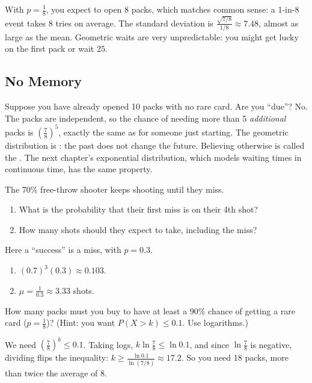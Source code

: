 With $p = \frac{1}{8}$, you expect to open $8$ packs, which matches common sense: a
1-in-8 event takes 8 tries on average. The standard deviation is
$\frac{\sqrt{7/8}}{1/8} \approx 7.48$, almost as large as the mean. Geometric waits are
very unpredictable: you might get lucky on the first pack or wait 25.

\subsection{No Memory}
Suppose you have already opened 10 packs with no rare card. Are you ``due''? No. The
packs are independent, so the chance of needing more than 5 \emph{additional} packs is
$\left(\frac{7}{8}\right)^5$, exactly the same as for someone just starting. The geometric
distribution is : the past does not change the future. Believing
otherwise is called the . The next chapter's exponential
distribution, which models waiting times in continuous time, has the same property.

\begin{Exercise}[title={The First Miss}, label=bg_miss]
The 70\% free-throw shooter keeps shooting until they miss.
\begin{enumerate}
\item What is the probability that their first miss is on their 4th shot?
\item How many shots should they expect to take, including the miss?
\end{enumerate}
\end{Exercise}
\begin{Answer}[ref=bg_miss]
Here a ``success'' is a miss, with $p = 0.3$.
\begin{enumerate}
\item $(0.7)^3(0.3) \approx 0.103$.
\item $\mu = \frac{1}{0.3} \approx 3.33$ shots.
\end{enumerate}
\end{Answer}

\begin{Exercise}[title={How Many Packs to Be Sure?}, label=bg_packs]
How many packs must you buy to have at least a 90\% chance of getting a rare card
($p = \frac{1}{8}$)? (Hint: you want $P(X > k) \leq 0.1$. Use logarithms.)
\end{Exercise}
\begin{Answer}[ref=bg_packs]
We need $\left(\frac{7}{8}\right)^k \leq 0.1$. Taking logs,
$k\ln\frac{7}{8} \leq \ln 0.1$, and since $\ln\frac{7}{8}$ is negative, dividing flips the
inequality: $k \geq \frac{\ln 0.1}{\ln(7/8)} \approx 17.2$. So you need 18 packs, more than
twice the average of 8.
\end{Answer}

